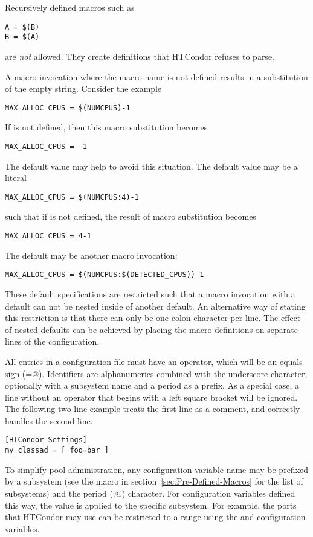 Recursively defined macros such as
\begin{verbatim}
A = $(B)
B = $(A)
\end{verbatim}
are \emph{not} allowed.
They create definitions that HTCondor refuses to parse. 

A macro invocation where the macro name is not defined results
in a substitution of the empty string.
Consider the example
\begin{verbatim}
MAX_ALLOC_CPUS = $(NUMCPUS)-1
\end{verbatim}
If  is not defined, then this macro substitution
becomes
\begin{verbatim}
MAX_ALLOC_CPUS = -1
\end{verbatim}
The default value may help to avoid this situation.
The default value may be a literal
\begin{verbatim}
MAX_ALLOC_CPUS = $(NUMCPUS:4)-1
\end{verbatim}
such that if  is not defined, the result of macro
substitution becomes
\begin{verbatim}
MAX_ALLOC_CPUS = 4-1
\end{verbatim}
The default may be another macro invocation:
\begin{verbatim}
MAX_ALLOC_CPUS = $(NUMCPUS:$(DETECTED_CPUS))-1
\end{verbatim}
These default specifications are restricted such that 
a macro invocation with a default can not be nested inside of another default.  
An alternative way of stating this restriction is that there can
only be one colon character per line. 
The effect of nested defaults can be achieved by placing the
macro definitions on separate lines of the configuration.

All entries in a configuration file must have an operator,
which will be an equals sign (\verb@=@).
Identifiers are alphanumerics combined with the underscore character,
optionally with a subsystem name and a period as a prefix.
As a special case,
a line without an operator that begins with a left square bracket
will be ignored.
The following two-line example treats the first line as a comment,
and correctly handles the second line.
\begin{verbatim}
[HTCondor Settings]
my_classad = [ foo=bar ]
\end{verbatim}

To simplify pool administration,
any configuration variable name may be prefixed by
a subsystem 
(see the  macro in 
section~\ref{sec:Pre-Defined-Macros}
for the list of subsystems)
and the period (\verb@.@) character.
For configuration variables defined this way,
the value is applied to the specific subsystem.
For example,
the ports that HTCondor may use can be restricted to a range 
using the  and  configuration
variables.

